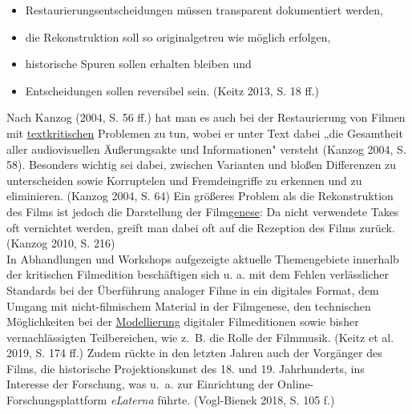 \documentclass{article}
\begin{document}
        \begin{itemize}\item {Restaurierungsentscheidungen müssen transparent dokumentiert werden,}\item {die Rekonstruktion soll so originalgetreu wie möglich erfolgen,}\item {historische Spuren sollen erhalten bleiben und}\item {Entscheidungen sollen reversibel sein. (Keitz 2013, S. 18 ff.)}\end{itemize}Nach Kanzog (2004, S. 56 ff.) hat man es auch bei der Restaurierung
                  von Filmen mit \href{http://gams.uni-graz.at/o:konde.192}{textkritischen} Problemen zu tun, wobei er unter Text dabei „die Gesamtheit
                  aller audiovisuellen Äußerungsakte und Informationen" versteht (Kanzog 2004,
                     S. 58). Besonders wichtig sei dabei, zwischen Varianten und bloßen
                  Differenzen zu unterscheiden sowie Korruptelen und Fremdeingriffe zu erkennen und
                  zu eliminieren. (Kanzog 2004, S. 64) Ein größeres Problem als die
                  Rekonstruktion des Films ist jedoch die Darstellung der Film\href{http://gams.uni-graz.at/o:konde.28}{genese}: Da nicht verwendete Takes oft vernichtet
                  werden, greift man dabei oft auf die Rezeption des Films zurück. (Kanzog
                     2010, S. 216)\\
            
        In Abhandlungen und Workshops aufgezeigte aktuelle Themengebiete innerhalb der
                  kritischen Filmedition beschäftigen sich u. a. mit dem Fehlen verlässlicher
                  Standards bei der Überführung analoger Filme in ein digitales Format, dem Umgang
                  mit nicht-filmischem Material in der Filmgenese, den technischen Möglichkeiten bei
                  der \href{http://gams.uni-graz.at/o:konde.137}{Modellierung} digitaler
                  Filmeditionen sowie bisher vernachlässigten Teilbereichen, wie z. B. die Rolle der
                  Filmmusik. (Keitz et al. 2019, S. 174 ff.) Zudem rückte in den
                  letzten Jahren auch der Vorgänger des Films, die historische Projektionskunst des
                  18. und 19. Jahrhunderts, ins Interesse der Forschung, was u. a. zur Einrichtung
                  der Online-Forschungsplattform \emph{eLaterna} führte.
                     (Vogl-Bienek 2018, S. 105 f.)\\
            
\end{document}
